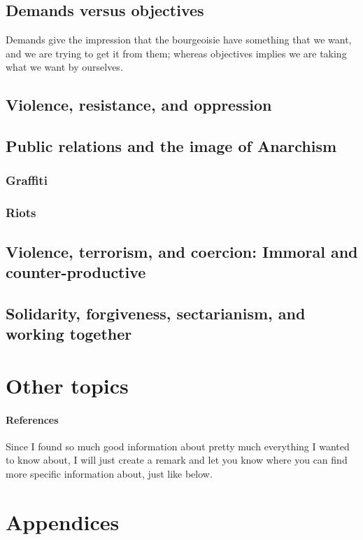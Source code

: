 \documentclass[11pt,fleqn]{memoir} %
\begin{document}
  
  \chapter{Demands versus objectives}
    Demands give the impression that the bourgeoisie have something that we want, and we are trying to get it from them; whereas objectives implies we are taking what we want by ourselves.

  \chapter{Violence, resistance, and oppression}

  \chapter{Public relations and the image of Anarchism}
    \section{Graffiti}
    \section{Riots}


  \chapter{Violence, terrorism, and coercion: Immoral and counter-productive}


  \chapter{Solidarity, forgiveness, sectarianism, and working together}



\part{Other topics}




\subsection{References}

Since I found so much good information about pretty much everything I wanted to know about, I will just create a remark and let you know where you can find more specific information about, just like below.


\part{Appendices}

\end{document}
